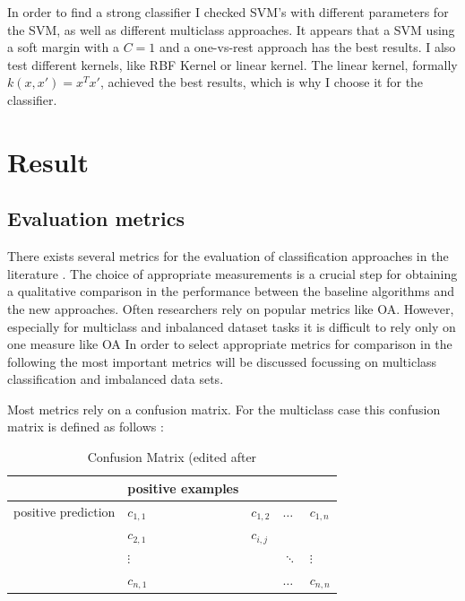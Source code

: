 \documentclass[12pt, a4paper, titlepage]{article}
\begin{document}
In order to find a strong classifier I checked \ac{SVM}'s with different parameters for the \ac{SVM}, as well as different multiclass approaches. It appears that a SVM using a soft margin with a $C=1$ and a one-vs-rest approach has the best results. I also test different kernels, like  RBF Kernel or linear kernel. The linear kernel, formally  $k(x, x') = x^Tx'$, achieved the best results, which is why I choose it for the classifier. 

\section{Result}
\subsection{Evaluation metrics}
There exists several metrics for the evaluation of classification approaches in the literature \citep{Fatourechi2008}. The choice of appropriate measurements is a crucial step for obtaining a qualitative comparison in the performance between the baseline algorithms and the new approaches. Often researchers rely on popular metrics like \ac{OA}. However, especially for multiclass and inbalanced dataset tasks it is difficult to rely only on one measure like \ac{OA} In order to select appropriate metrics for comparison in the following the most important metrics will be discussed focussing on multiclass classification and imbalanced data sets. 

Most metrics rely on a confusion matrix. For the multiclass case this confusion matrix is defined as follows \citep{Kautz2017}: 
\begin{table}[hb!]
  \center
  \begin{tabular}{lllll}
  \hline
            & positive examples      &           &             &             \\ \hline
  positive prediction  & $c_{1,1}$ & $c_{1,2}$ & $\dots$     & $c_{1,n}$   \\
            & $c_{2,1}$ & $c_{i,j}$ &             &             \\
            &  $\vdots$         &           & $\ddots$ &   $\vdots$\\
            & $c_{n,1}$ &           & $\dots$     & $c_{n,n}$   \\ \hline
  \end{tabular}
  \caption{\label{tab: T1} Confusion Matrix (edited after \citep[113]{Kautz2017}}
  \end{table}
\end{document}
